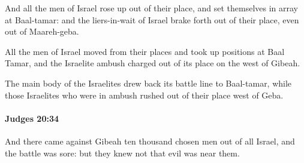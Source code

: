			\begin{versebox}
					\item[BHS] 
					\item[ASV] And all the men of Israel rose up out of their place, and set themselves in array at Baal-tamar: and the liers-in-wait of Israel brake forth out of their place, even out of Maareh-geba.
					\item[NIV] All the men of Israel moved from their places and took up positions at Baal Tamar, and the Israelite ambush charged out of its place on the west of Gibeah.
					\item[NRSV] The main body of the Israelites drew back its battle line to Baal-tamar, while those Israelites who were in ambush rushed out of their place west of Geba.
			\end{versebox}

		\paragraph{Judges 20:34} %
			\label{JUDGES-20-34}

			And there came against Gibeah ten thousand chosen men out of all Israel, and the battle was sore: but they knew not that evil was near them.

